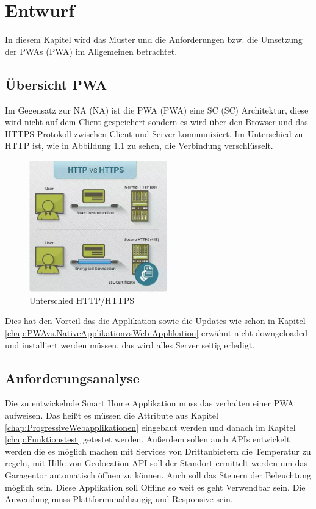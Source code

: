 \chapter{Entwurf}
\thispagestyle{standard}
\pagestyle{standard}
\renewcommand{\footrulewidth}{0.4pt}

In diesem Kapitel wird das Muster und die Anforderungen bzw. die Umsetzung der \aclp{PWA} (\acs{PWA}) im Allgemeinen betrachtet.


\section{Übersicht PWA}\label{sub:Übersicht PWA}
Im Gegensatz zur \acl{NA} (\acs{NA}) ist die \acl{PWA} (\acs{PWA}) eine \acl{SC} (\acs{SC}) Architektur, diese wird nicht auf dem Client gespeichert sondern es wird über den Browser und das HTTPS-Protokoll zwischen Client und Server kommuniziert. Im Unterschied zu HTTP ist, wie in Abbildung \ref{fig:HTTP_HTTPS} zu sehen, die Verbindung verschlüsselt.

\begin{figure}[h]
	\centering
	\includegraphics[width=6cm]{BilderAllgemein/HTTP_HTTPS}\medskip
	\caption{Unterschied HTTP/HTTPS \cite{HTTPS}}
	\label{fig:HTTP_HTTPS}
\end{figure}

Dies hat den Vorteil das die Applikation sowie die Updates wie schon in Kapitel \ref{chap:PWAvs.NativeApplikationvsWeb Applikation} erwähnt nicht downgeloaded und installiert werden müssen, das wird alles Server seitig erledigt. 

\newpage

\section{Anforderungsanalyse}\label{sub:Anforderungsanalyse}
Die zu entwickelnde Smart Home Applikation muss das verhalten einer \acs{PWA} aufweisen. Das heißt es müssen die Attribute aus Kapitel \ref{chap:ProgressiveWebapplikationen} eingebaut werden und danach im Kapitel \ref{chap:Funktionstest} getestet werden. Außerdem sollen auch APIs entwickelt werden die es möglich machen mit Services von Drittanbietern die Temperatur zu regeln, mit Hilfe von Geolocation API soll der Standort ermittelt werden um das Garagentor automatisch öffnen zu können. Auch soll das Steuern der Beleuchtung möglich sein. Diese Applikation soll Offline so weit es geht Verwendbar sein. Die Anwendung muss Plattformunabhängig und Responsive sein.



